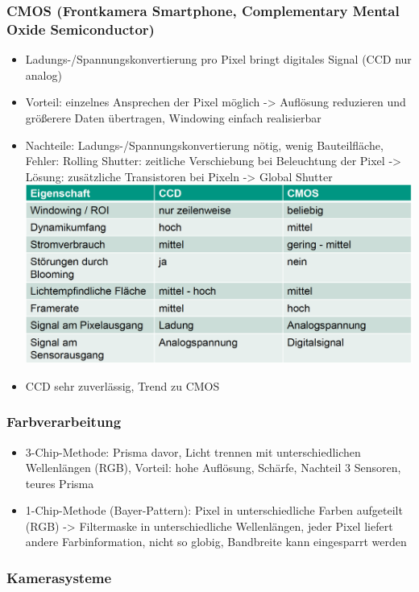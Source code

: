 \documentclass[paper=a4, fontsize=11pt]{scrartcl} %
\numberwithin{equation}{section} %
\numberwithin{figure}{section} %
\numberwithin{table}{section} %
\begin{document}
\subsubsection{CMOS (Frontkamera Smartphone, Complementary Mental Oxide Semiconductor)}
\begin{itemize}
\item Ladungs-/Spannungskonvertierung pro Pixel bringt digitales Signal (CCD nur analog)
\item Vorteil: einzelnes Ansprechen der Pixel möglich -> Auflösung reduzieren und größerere Daten übertragen, Windowing einfach realisierbar
\item Nachteile: Ladungs-/Spannungskonvertierung nötig, wenig Bauteilfläche, Fehler: Rolling Shutter: zeitliche Verschiebung bei Beleuchtung der Pixel -> Lösung: zusätzliche Transistoren bei Pixeln -> Global Shutter\\ 
\includegraphics[width=\textwidth]{imgs/ccd_cmos}
\item CCD sehr zuverlässig, Trend zu CMOS
\end{itemize}

\subsubsection{Farbverarbeitung}
\begin{itemize}
\item 3-Chip-Methode: Prisma davor, Licht trennen mit unterschiedlichen Wellenlängen (RGB), Vorteil: hohe Auflösung, Schärfe, Nachteil 3 Sensoren, teures Prisma
\item 1-Chip-Methode (Bayer-Pattern): Pixel in unterschiedliche Farben aufgeteilt (RGB) -> Filtermaske in unterschiedliche Wellenlängen, jeder Pixel liefert andere Farbinformation, nicht so globig, Bandbreite kann eingesparrt werden
\end{itemize}

\subsubsection{Kamerasysteme}
\end{document}
